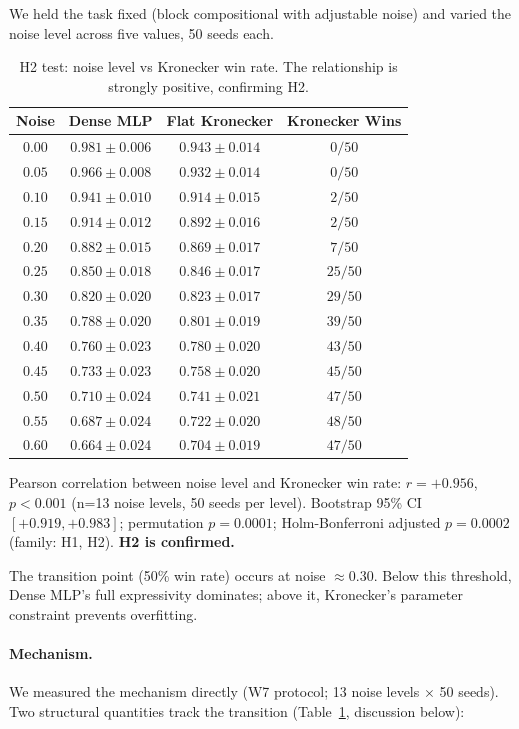 \documentclass[11pt,a4paper]{article}
\begin{document}
We held the task fixed (block compositional with adjustable noise)
and varied the noise level across five values, 50 seeds each.

\begin{table}[h]
\centering
\caption{H2 test: noise level vs Kronecker win rate. The
relationship is strongly positive, confirming H2.}
\label{tab:h2}
\small
\begin{tabular}{cccc}
\toprule
Noise & Dense MLP & Flat Kronecker & Kronecker Wins \\
\midrule
$0.00$ & $0.981 \pm 0.006$ & $0.943 \pm 0.014$ & $0/50$ \\
$0.05$ & $0.966 \pm 0.008$ & $0.932 \pm 0.014$ & $0/50$ \\
$0.10$ & $0.941 \pm 0.010$ & $0.914 \pm 0.015$ & $2/50$ \\
$0.15$ & $0.914 \pm 0.012$ & $0.892 \pm 0.016$ & $2/50$ \\
$0.20$ & $0.882 \pm 0.015$ & $0.869 \pm 0.017$ & $7/50$ \\
$0.25$ & $0.850 \pm 0.018$ & $0.846 \pm 0.017$ & $25/50$ \\
$0.30$ & $0.820 \pm 0.020$ & $0.823 \pm 0.017$ & $29/50$ \\
$0.35$ & $0.788 \pm 0.020$ & $0.801 \pm 0.019$ & $39/50$ \\
$0.40$ & $0.760 \pm 0.023$ & $0.780 \pm 0.020$ & $43/50$ \\
$0.45$ & $0.733 \pm 0.023$ & $0.758 \pm 0.020$ & $45/50$ \\
$0.50$ & $0.710 \pm 0.024$ & $0.741 \pm 0.021$ & $47/50$ \\
$0.55$ & $0.687 \pm 0.024$ & $0.722 \pm 0.020$ & $48/50$ \\
$0.60$ & $0.664 \pm 0.024$ & $0.704 \pm 0.019$ & $47/50$ \\
\bottomrule
\end{tabular}
\end{table}

Pearson correlation between noise level and Kronecker win rate:
$r = +0.956$, $p < 0.001$ (n=13 noise levels, 50 seeds per level).
Bootstrap 95\% CI $[+0.919, +0.983]$; permutation $p = 0.0001$;
Holm-Bonferroni adjusted $p = 0.0002$ (family: H1, H2).
\textbf{H2 is confirmed.}

The transition point (50\% win rate) occurs at noise
$\approx 0.30$. Below this threshold, Dense MLP's full
expressivity dominates; above it, Kronecker's parameter
constraint prevents overfitting.

\paragraph{Mechanism.}
We measured the mechanism directly (W7 protocol; 13 noise
levels $\times$ 50 seeds). Two structural quantities track
the transition (Table~\ref{tab:h2}, discussion below):
\end{document}
